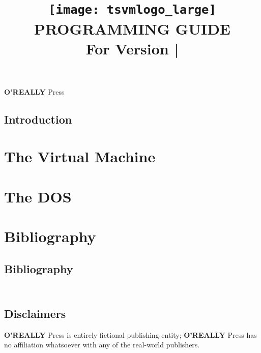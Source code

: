 \documentclass[10pt, stock, openany, chapter]{memoir}
\title{\vskip56pt \texttt{[image: tsvmlogo\_large]} \vskip3pt \titlefont\Huge\textbf{PROGRAMMING GUIDE} \\ \Large \vspace{1.2em} For Version \tsvmver\hspace{0.75em}|\hspace{0.75em}\theedition}
\date{}
\author{}
\newcommand{\oreallypress}{\begingroup\hspace{0.083em}\large\textbf{O'REALLY\raisebox{1ex}{\scriptsize ?}} \large Press\endgroup}
\begin{document}
\maketitle{}
\thispagestyle{empty}
\vfill
\oreallypress

\newpage


\thispagestyle{empty}

\newpage

\setcounter{page}{3}
\tableofcontents*



\openright
\chapter{Introduction}

\openany

% 

\part{The Virtual Machine}


\part{The DOS}


\part*{Bibliography}

\chapter*{Bibliography}


{
\let\clearpage\relax
\chapter*{\ \\ Disclaimers}

\oreallypress{} is entirely fictional publishing entity; \oreallypress{} has no affiliation whatsoever with any of the real-world publishers.

}
\end{document}
